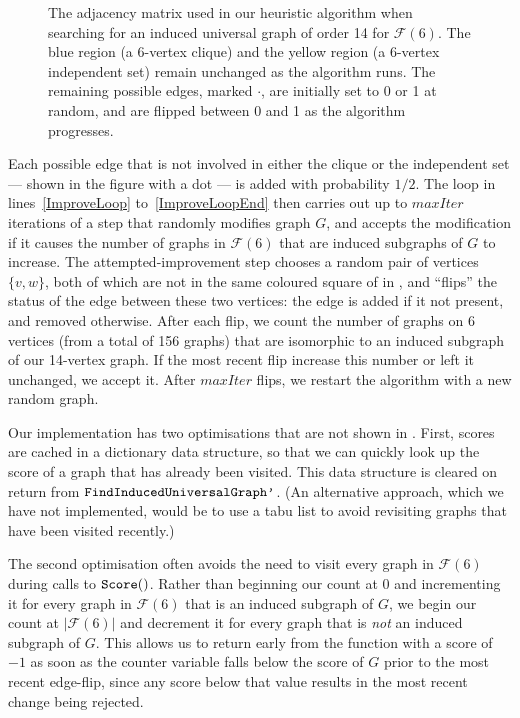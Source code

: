 \documentclass[12pt]{article}
\newcommand{\calF}{\ensuremath{\mathcal{F}}}
\newcommand{\AlgVar}[1]{\mathit{#1}}
\newcommand{\linerangeref}[2]{lines~\ref{#1} to~\ref{#2}}
\begin{document}
\begin{figure}[h!]
    \centering
    \footnotesize
    \caption{The adjacency matrix used in our heuristic algorithm when searching
        for an induced universal graph of order 14 for $\calF(6)$.  The blue
        region (a 6-vertex clique) and the yellow region (a 6-vertex independent
        set) remain unchanged as the algorithm runs.  The remaining possible edges,
        marked $\boldsymbol{\cdot}$, are initially set to 0 or 1 at random,
        and are flipped between 0 and 1 as the algorithm progresses.}
\label{fig:heuristic-regions}
\end{figure}

Each possible edge that is not involved in either the clique or the independent
set --- shown in the figure with a dot --- is added with probability $1/2$.
The loop in \linerangeref{ImproveLoop}{ImproveLoopEnd} then carries out up to
$\AlgVar{maxIter}$ iterations of a step that randomly modifies graph $G$,
and accepts the modification if it causes the number of graphs in $\calF(6)$ that
are induced subgraphs of $G$ to increase.
The attempted-improvement step chooses a random pair of vertices $\{v, w\}$,
both of which are not in the same coloured square of 
in , and
``flips'' the status of the edge between these two vertices: the edge is added if it
not present, and removed otherwise.
After each flip, we count the number of graphs on 6 vertices (from a total
of 156 graphs) that are
isomorphic to an induced subgraph of our 14-vertex graph.  If the most recent flip
increase this number or left it unchanged, we accept it.  After $\AlgVar{maxIter}$
flips, we restart the algorithm with a new random graph.

Our implementation has two optimisations that are not shown in .
First, scores are cached in a dictionary data structure, so that we can quickly look
up the score of a graph that has already been visited. This data structure is
cleared on return from $\FuncSty{FindInducedUniversalGraph'}$.
(An alternative approach, which we have not implemented, would be to
use a tabu list \cite{DBLP:books/daglib/0093574} to avoid revisiting graphs
that have been visited recently.)

The second optimisation often avoids the need to visit every graph in $\calF(6)$
during calls to $\FuncSty{Score}()$.  Rather than beginning our count at 0
and incrementing it for every graph in $\calF(6)$ that is an induced subgraph
of $G$, we begin our count at $|\calF(6)|$ and decrement it for every
graph that is \emph{not} an induced subgraph of $G$.  This allows us to return
early from the function with a score of $-1$ as soon as the counter variable
falls below the score of $G$ prior to the most recent edge-flip, since any
score below that value results in the most recent change being rejected.
\end{document}
